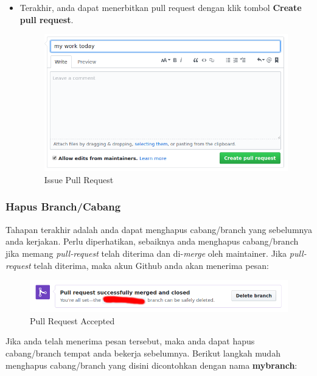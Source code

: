\documentclass[12pt]{article}
\begin{document}
\begin{itemize}
	 	\item Terakhir, anda dapat menerbitkan pull request dengan klik tombol \textbf{Create pull request}.
	 	
	 	\begin{figure}[h!]
	 		\centering
	 		\captionsetup{justification=centering}
	 		\includegraphics[width=0.8\linewidth]{../images/png/conpullreq}
	 		\caption[Issue Pull Request]{\small{Issue Pull Request}}
	 	\end{figure}
		  
	\end{itemize}

	\subsubsection{Hapus Branch/Cabang}
	
	Tahapan terakhir adalah anda dapat menghapus cabang/branch yang sebelumnya anda kerjakan.
	Perlu diperhatikan, sebaiknya anda menghapus cabang/branch jika memang \textit{pull-request} telah diterima dan di-\textit{merge} oleh maintainer.
	Jika \textit{pull-request} telah diterima, maka akun Github anda akan menerima pesan:
	 
	\begin{figure}[h!]
		\centering
		\captionsetup{justification=centering}
		\includegraphics[width=0.8\linewidth]{../images/png/mergeok}
		\caption[Pull Request Accepted]{\small{Pull Request Accepted}}
	\end{figure}

	Jika anda telah menerima pesan tersebut, maka anda dapat hapus cabang/branch tempat anda bekerja sebelumnya.
	Berikut langkah mudah menghapus cabang/branch yang disini dicontohkan dengan nama \textbf{mybranch}:
	
\end{document}
